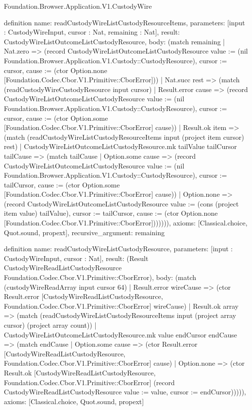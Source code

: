 \begin{lexlean}{Foundation.Browser.Application.V1.CustodyWire}
\begin{semanticmodule}
definition{
  name: readCustodyWireListCustodyResourceItems,
  parameters: [input : CustodyWireInput, cursor : Nat, remaining : Nat],
  result: CustodyWireListOutcomeListCustodyResource,
  body: (match remaining
    | Nat.zero => (record CustodyWireListOutcomeListCustodyResource {value := (nil Foundation.Browser.Application.V1.Custody::CustodyResource), cursor := cursor, cause := (ctor Option.none [Foundation.Codec.Cbor.V1.Primitive::CborError])})
    | Nat.succ rest => (match (readCustodyWireCustodyResource input cursor)
      | Result.error cause => (record CustodyWireListOutcomeListCustodyResource {value := (nil Foundation.Browser.Application.V1.Custody::CustodyResource), cursor := cursor, cause := (ctor Option.some [Foundation.Codec.Cbor.V1.Primitive::CborError] cause)})
      | Result.ok item => (match (readCustodyWireListCustodyResourceItems input (project item cursor) rest)
        | CustodyWireListOutcomeListCustodyResource.mk tailValue tailCursor tailCause => (match tailCause
          | Option.some cause => (record CustodyWireListOutcomeListCustodyResource {value := (nil Foundation.Browser.Application.V1.Custody::CustodyResource), cursor := tailCursor, cause := (ctor Option.some [Foundation.Codec.Cbor.V1.Primitive::CborError] cause)})
          | Option.none => (record CustodyWireListOutcomeListCustodyResource {value := (cons (project item value) tailValue), cursor := tailCursor, cause := (ctor Option.none [Foundation.Codec.Cbor.V1.Primitive::CborError])}))))),
  axioms: [Classical.choice, Quot.sound, propext],
  recursive_argument: remaining
}

definition{
  name: readCustodyWireListCustodyResource,
  parameters: [input : CustodyWireInput, cursor : Nat],
  result: (Result CustodyWireReadListCustodyResource Foundation.Codec.Cbor.V1.Primitive::CborError),
  body: (match (custodyWireReadArray input cursor 64)
    | Result.error wireCause => (ctor Result.error [CustodyWireReadListCustodyResource, Foundation.Codec.Cbor.V1.Primitive::CborError] wireCause)
    | Result.ok array => (match (readCustodyWireListCustodyResourceItems input (project array cursor) (project array count))
      | CustodyWireListOutcomeListCustodyResource.mk value endCursor endCause => (match endCause
        | Option.some cause => (ctor Result.error [CustodyWireReadListCustodyResource, Foundation.Codec.Cbor.V1.Primitive::CborError] cause)
        | Option.none => (ctor Result.ok [CustodyWireReadListCustodyResource, Foundation.Codec.Cbor.V1.Primitive::CborError] (record CustodyWireReadListCustodyResource {value := value, cursor := endCursor}))))),
  axioms: [Classical.choice, Quot.sound, propext]
}


\end{semanticmodule}
\end{lexlean}
